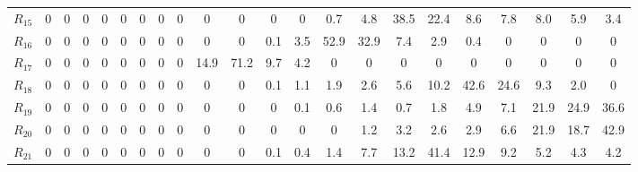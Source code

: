 \begin{table}[h!]
\begin{tabularx}{\textwidth}{X|CCCCCCCCCCCCCCCCCCCCC}
$R_{15}$ & 0 & 0 & 0 & 0 & 0 & 0 & 0 & 0 & 0 & 0 & 0 & 0 & 0.7 & 4.8 & 38.5 & 22.4 & 8.6 & 7.8 & 8.0 & 5.9 & 3.4 \\
$R_{16}$ & 0 & 0 & 0 & 0 & 0 & 0 & 0 & 0 & 0 & 0 & 0.1 & 3.5 & 52.9 & 32.9 & 7.4 & 2.9 & 0.4 & 0 & 0 & 0 & 0 \\
$R_{17}$ & 0 & 0 & 0 & 0 & 0 & 0 & 0 & 0 & 14.9 & 71.2 & 9.7 & 4.2 & 0 & 0 & 0 & 0 & 0 & 0 & 0 & 0 & 0 \\
$R_{18}$ & 0 & 0 & 0 & 0 & 0 & 0 & 0 & 0 & 0 & 0 & 0.1 & 1.1 & 1.9 & 2.6 & 5.6 & 10.2 & 42.6 & 24.6 & 9.3 & 2.0 & 0 \\
$R_{19}$ & 0 & 0 & 0 & 0 & 0 & 0 & 0 & 0 & 0 & 0 & 0 & 0.1 & 0.6 & 1.4 & 0.7 & 1.8 & 4.9 & 7.1 & 21.9 & 24.9 & 36.6 \\
$R_{20}$ & 0 & 0 & 0 & 0 & 0 & 0 & 0 & 0 & 0 & 0 & 0 & 0 & 0 & 1.2 & 3.2 & 2.6 & 2.9 & 6.6 & 21.9 & 18.7 & 42.9 \\
$R_{21}$ & 0 & 0 & 0 & 0 & 0 & 0 & 0 & 0 & 0 & 0 & 0.1 & 0.4 & 1.4 & 7.7 & 13.2 & 41.4 & 12.9 & 9.2 & 5.2 & 4.3 & 4.2 \\
\bottomrule
\end{tabularx}
\end{table}
